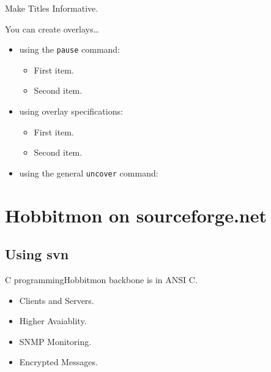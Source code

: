 \documentclass{beamer}
\begin{document}
\begin{frame}{Make Titles Informative.}

  You can create overlays\dots
  \begin{itemize}
  \item using the \texttt{pause} command:
    \begin{itemize}
    \item
      First item.
      \pause
    \item    
      Second item.
    \end{itemize}
  \item
    using overlay specifications:
    \begin{itemize}
    \item<3->
      First item.
    \item<4->
      Second item.
    \end{itemize}
  \item
    using the general \texttt{uncover} command:
    \begin{itemize}
    \end{itemize}
  \end{itemize}
\end{frame}





\section{Hobbitmon on sourceforge.net}

\subsection[Checking Source code ]{Using svn}

\begin{frame}{C programming}{Hobbitmon backbone is in ANSI C.}

  \begin{itemize}
  \item
    Clients and Servers.
  \item
    Higher Avaiablity.
  \item
    SNMP Monitoring.
  \item
    Encrypted Messages. 
  \end{itemize}
\end{frame}
\end{document}
